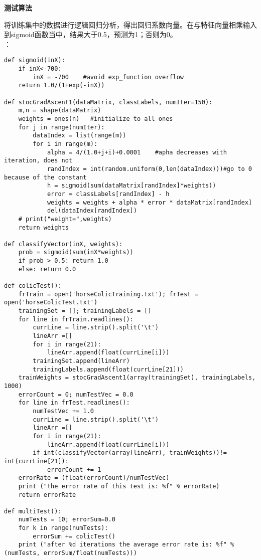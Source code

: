 \noindent\textbf{测试算法}\par
将训练集中的数据进行逻辑回归分析，得出回归系数向量。在与特征向量相乘输入到sigmoid函数当中，结果大于0.5，预测为1；否则为0。\\
：
\begin{lstlisting}
def sigmoid(inX):
    if inX<-700:
        inX = -700    #avoid exp_function overflow
    return 1.0/(1+exp(-inX))

def stocGradAscent1(dataMatrix, classLabels, numIter=150):
    m,n = shape(dataMatrix)
    weights = ones(n)   #initialize to all ones
    for j in range(numIter):
        dataIndex = list(range(m))
        for i in range(m):
            alpha = 4/(1.0+j+i)+0.0001    #apha decreases with iteration, does not
            randIndex = int(random.uniform(0,len(dataIndex)))#go to 0 because of the constant
            h = sigmoid(sum(dataMatrix[randIndex]*weights))
            error = classLabels[randIndex] - h
            weights = weights + alpha * error * dataMatrix[randIndex]
            del(dataIndex[randIndex])
    # print("weight=",weights)
    return weights

def classifyVector(inX, weights):
    prob = sigmoid(sum(inX*weights))
    if prob > 0.5: return 1.0
    else: return 0.0

def colicTest():
    frTrain = open('horseColicTraining.txt'); frTest = open('horseColicTest.txt')
    trainingSet = []; trainingLabels = []
    for line in frTrain.readlines():
        currLine = line.strip().split('\t')
        lineArr =[]
        for i in range(21):
            lineArr.append(float(currLine[i]))
        trainingSet.append(lineArr)
        trainingLabels.append(float(currLine[21]))
    trainWeights = stocGradAscent1(array(trainingSet), trainingLabels, 1000)
    errorCount = 0; numTestVec = 0.0
    for line in frTest.readlines():
        numTestVec += 1.0
        currLine = line.strip().split('\t')
        lineArr =[]
        for i in range(21):
            lineArr.append(float(currLine[i]))
        if int(classifyVector(array(lineArr), trainWeights))!= int(currLine[21]):
            errorCount += 1
    errorRate = (float(errorCount)/numTestVec)
    print ("the error rate of this test is: %f" % errorRate)
    return errorRate

def multiTest():
    numTests = 10; errorSum=0.0
    for k in range(numTests):
        errorSum += colicTest()
    print ("after %d iterations the average error rate is: %f" % (numTests, errorSum/float(numTests)))
\end{lstlisting}


